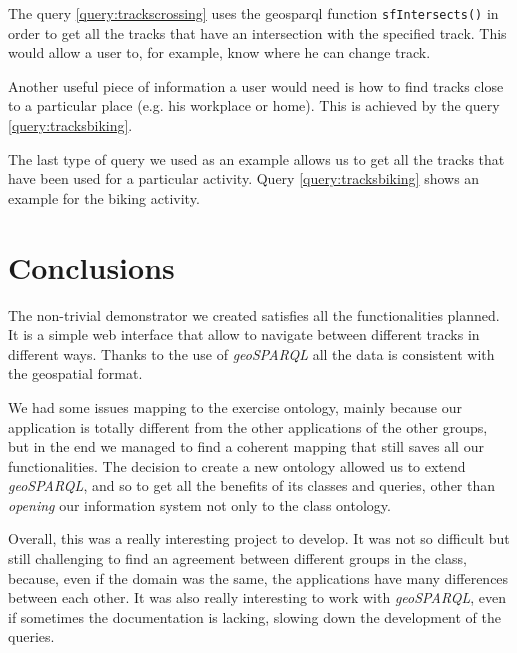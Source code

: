 \documentclass[11pt,a4paper]{scrreprt}
\begin{document}
The query \ref{query:trackscrossing} uses the geosparql function \texttt{sfIntersects()} in order to get all the tracks that have an intersection with the specified track. This would allow a user to, for example, know where he can change track.

Another useful piece of information a user would need is how to find tracks close to a particular place (e.g. his workplace or home). This is achieved by the query \ref{query:tracksbiking}.

The last type of query we used as an example allows us to get all the tracks that have been used for a particular activity. Query \ref{query:tracksbiking} shows an example for the biking activity.





\chapter{Conclusions}
The non-trivial demonstrator we created satisfies all the functionalities planned. 
It is a simple web interface that allow to navigate between different tracks in different ways. Thanks to the use of \textit{geoSPARQL} all the data is consistent with the geospatial format.

We had some issues mapping to the exercise ontology, mainly because our application is totally different from the other applications of the other groups, but in the end we managed to find a coherent mapping that still saves all our functionalities.
The decision to create a new ontology allowed us to extend \textit{geoSPARQL}, and so to get all the benefits of its classes and queries, other than \textit{opening} our information system not only to the class ontology.

Overall, this was a really interesting project to develop. 
It was not so difficult but still challenging to find an agreement between different groups in the class, because, even if the domain was the same, the applications have many differences between each other.
It was also really interesting to work with \textit{geoSPARQL}, even if sometimes the documentation is lacking, slowing down the development of the queries.
\end{document}

